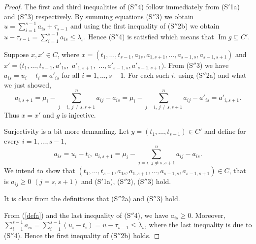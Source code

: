 \documentclass[ALCO,Unicode]{cedram}
\DeclareMathOperator{\im}{Im}
\numberwithin{equation}{section}
\begin{document}
\begin{proof}
The first and third inequalities of (S$''$4) follow immediately from (S$'$1a) and (S$''$3) respectively. By summing equations (S$''$3)  we obtain $u=\sum_{i=1}^{s-1}a_{is}+\tau_{s-1}$ and using the first inequality of (S$''$2b) we obtain $u-\tau_{s-1}= \sum_{i=1}^{s-1}a_{is} \le \lambda_s$. Hence (S$''$4) is satisfied which means that $\im g \subseteq C'$.

 Suppose $x,x' \in C$, where $x=(t_1,\dots,t_{s-1},a_{1s}, a_{1,s+1},\dots,a_{s-1,s}, a_{s-1,s+1})$ and $x'=(t_1,\dots,t_{s-1},a'_{1s},$ $ a'_{1,s+1},$ $\dots,a'_{s-1,s}, a'_{s-1,s+1})$. From (S$''$3) we have $a_{is}=u_i-t_i = a'_{is}$ for all $i=1,\dots,s-1$. For each such $i$, using (S$''$2a) and what we just showed, \[a_{i,s+1}=\mu_i -\sum_{j=i, \  j \neq s, s+1}^{n}a_{ij}-a_{is} = \mu_i -\sum_{j=i, \  j \neq s, s+1}^{n}a_{ij}-a'_{is} =a'_{i,s+1}.\]
Thus $x=x'$ and $g$ is injective.

Surjectivity is a bit more demanding. Let $y=(t_1,\dots,t_{s-1}) \in C'$ and define for every $i=1,\dots,s-1,$
\begin{equation}\label{defa}
	a_{is}=u_i-t_i, \  
	a_{i,s+1}=\mu_i-\sum_{j=i, \  j \neq s, s+1}^{n}a_{ij}-a_{is}.
\end{equation}
We intend to show that $(t_1,\dots,t_{s-1},a_{1s},a_{1,s+1},\dots,a_{s-1,s}, a_{s-1,s+1}) \in C$, that is $a_{ij} \ge 0$ $ (j=s,s+1)$ and (S$'$1a), (S$''$2), (S$''$3) hold. 

It is clear from the definitions that (S$''$2a) and (S$''$3) hold.

From (\ref{defa}) and the last inequality of (S$''$4), we have $a_{is} \ge 0$. Moreover,  $\sum_{i=1}^{s-1}a_{is}=\sum_{i=1}^{s-1}(u_i-t_i)=u-\tau_{s-1} \le \lambda_{s}$, where the last inequality is due to (S$''$4). Hence the first inequality of (S$''$2b) holds. 


\end{proof}
\end{document}
